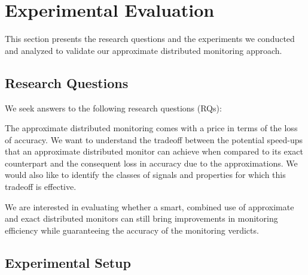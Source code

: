 \section{Experimental Evaluation} \label{sec:experiments}

This section presents the research questions and the experiments we conducted and analyzed to validate our approximate distributed monitoring approach.

\subsection{Research Questions}

We seek answers to the following research questions (RQs):

\begin{resq}
The  approximate distributed monitoring comes with a price in terms of the loss of accuracy.
We want to understand the tradeoff between the potential speed-ups that an approximate distributed monitor can achieve when compared to its exact counterpart and the consequent loss in accuracy due to the approximations.
We would also like to identify the classes of signals and properties for which this tradeoff is effective. 
\end{resq}

\begin{resq}
We are interested in evaluating whether a smart, combined use of approximate and exact distributed monitors can still bring improvements in monitoring efficiency while guaranteeing the accuracy of the monitoring verdicts. 
\end{resq}

\subsection{Experimental Setup}


